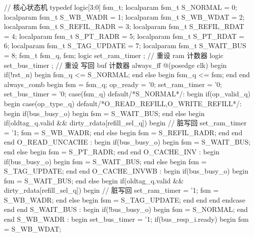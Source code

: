 \begin{CodeBlock}[language=BookSystemVerilog]
  // 核心状态机
  typedef logic[3:0] fsm_t;
  localparam fsm_t S_NORMAL     = 0;
  localparam fsm_t S_WB_WADR    = 1;
  localparam fsm_t S_WB_WDAT    = 2;
  localparam fsm_t S_REFIL_RADR = 3;
  localparam fsm_t S_REFIL_RDAT = 4;
  localparam fsm_t S_PT_RADR    = 5;
  localparam fsm_t S_PT_RDAT    = 6;
  localparam fsm_t S_TAG_UPDATE = 7;
  localparam fsm_t S_WAIT_BUS   = 8;
  fsm_t fsm_q, fsm;
  logic            set_ram_timer       ; // 重设 ram 计数器
  logic            set_bus_timer       ; // 重设 写回 buf 计数器
  always_ff @(posedge clk) begin
    if(!rst_n) begin
      fsm_q <= S_NORMAL;
    end
    else begin
      fsm_q <= fsm;
    end
  end
  always_comb begin
    fsm       = fsm_q;
    op_ready  = '0;
    set_ram_timer = '0;
    set_bus_timer = '0;
    case(fsm_q)
      default/*S_NORMAL*/: begin
        if(op_valid_q) begin
          case(op_type_q)
            default/*O_READ_REFILL,O_WRITE_REFILL*/: begin
              if(bus_busy_o) begin
                fsm = S_WAIT_BUS;
              end
              else begin
                if(oldtag_q.valid && dirty_rdata[refill_sel_q]) begin
                  // 脏写回
                  set_ram_timer = '1;
                  fsm       = S_WB_WADR;
                end
                else begin
                  fsm = S_REFIL_RADR;
                end
              end
            end
            O_READ_UNCACHE : begin
              if(bus_busy_o) begin
                fsm = S_WAIT_BUS;
              end
              else begin
                fsm = S_PT_RADR;
              end
            end
            O_CACHE_INV : begin
              if(bus_busy_o) begin
                fsm = S_WAIT_BUS;
              end
              else begin
                fsm = S_TAG_UPDATE;
              end
            end
            O_CACHE_INVWB : begin
              if(bus_busy_o) begin
                fsm = S_WAIT_BUS;
              end
              else begin
                if(oldtag_q.valid && dirty_rdata[refill_sel_q]) begin
                  // 脏写回
                  set_ram_timer = '1;
                  fsm       = S_WB_WADR;
                end
                else begin
                  fsm = S_TAG_UPDATE;
                end
              end
            end
          endcase
        end
      end
      S_WAIT_BUS : begin
        if(!bus_busy_o) begin
          fsm = S_NORMAL;
        end
      end
      S_WB_WADR : begin
        set_bus_timer = '1;
        if(bus_resp_i.ready) begin
          fsm = S_WB_WDAT;

\end{CodeBlock}
